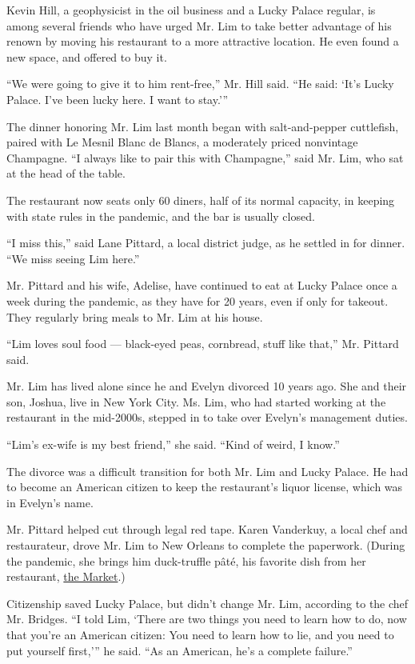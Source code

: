 Kevin Hill, a geophysicist in the oil business and a Lucky Palace
regular, is among several friends who have urged Mr. Lim to take better
advantage of his renown by moving his restaurant to a more attractive
location. He even found a new space, and offered to buy it.

``We were going to give it to him rent-free,'' Mr. Hill said. ``He said:
`It's Lucky Palace. I've been lucky here. I want to stay.'''

The dinner honoring Mr. Lim last month began with salt-and-pepper
cuttlefish, paired with Le Mesnil Blanc de Blancs, a moderately priced
nonvintage Champagne. ``I always like to pair this with Champagne,''
said Mr. Lim, who sat at the head of the table.

The restaurant now seats only 60 diners, half of its normal capacity, in
keeping with state rules in the pandemic, and the bar is usually closed.

``I miss this,'' said Lane Pittard, a local district judge, as he
settled in for dinner. ``We miss seeing Lim here.''

Mr. Pittard and his wife, Adelise, have continued to eat at Lucky Palace
once a week during the pandemic, as they have for 20 years, even if only
for takeout. They regularly bring meals to Mr. Lim at his house.

``Lim loves soul food --- black-eyed peas, cornbread, stuff like that,''
Mr. Pittard said.

Mr. Lim has lived alone since he and Evelyn divorced 10 years ago. She
and their son, Joshua, live in New York City. Ms. Lim, who had started
working at the restaurant in the mid-2000s, stepped in to take over
Evelyn's management duties.

``Lim's ex-wife is my best friend,'' she said. ``Kind of weird, I
know.''

The divorce was a difficult transition for both Mr. Lim and Lucky
Palace. He had to become an American citizen to keep the restaurant's
liquor license, which was in Evelyn's name.

Mr. Pittard helped cut through legal red tape. Karen Vanderkuy, a local
chef and restaurateur, drove Mr. Lim to New Orleans to complete the
paperwork. (During the pandemic, she brings him duck-truffle pâté, his
favorite dish from her restaurant,
\href{https://www.themarketshreveport.com/}{the Market}.)

Citizenship saved Lucky Palace, but didn't change Mr. Lim, according to
the chef Mr. Bridges. ``I told Lim, `There are two things you need to
learn how to do, now that you're an American citizen: You need to learn
how to lie, and you need to put yourself first,''' he said. ``As an
American, he's a complete failure.''

